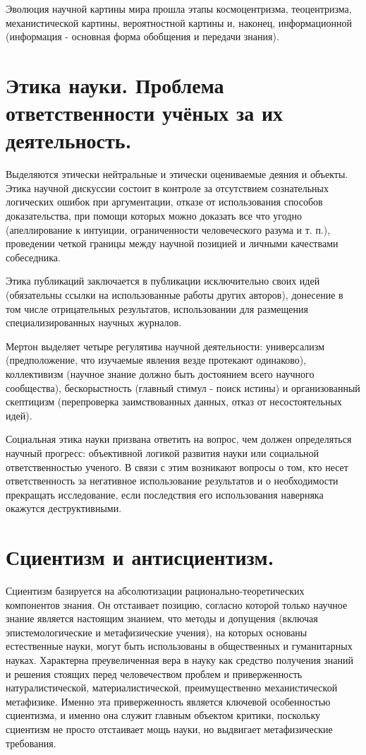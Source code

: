 \documentclass[12pt, specialist, subf, substylefile = spbu.rtx]{disser}
\begin{document}
Эволюция научной картины мира прошла этапы космоцентризма, теоцентризма, механистической картины, вероятностной картины и, наконец, информационной (информация - основная форма обобщения и передачи знания).

\section{Этика науки. Проблема ответственности учёных за их деятельность.}
Выделяются этически нейтральные и этически оцениваемые деяния и объекты.
Этика научной дискуссии состоит в контроле за отсутствием сознательных логических ошибок при аргументации, отказе от использования способов доказательства, при помощи которых можно доказать все что угодно (апеллирование к интуиции, ограниченности человеческого разума и т. п.), проведении четкой границы между научной позицией и личными качествами собеседника.

Этика публикаций заключается в публикации исключительно своих идей (обязательны ссылки на использованные работы других авторов), донесение в том числе отрицательных результатов, использовании для размещения специализированных научных журналов.

Мертон выделяет четыре регулятива научной деятельности: универсализм (предположение, что изучаемые явления везде протекают одинаково), коллективизм (научное знание должно быть достоянием всего научного сообщества), бескорыстность (главный стимул - поиск истины) и организованный скептицизм (перепроверка заимствованных данных, отказ от несостоятельных идей).

Социальная этика науки призвана ответить на вопрос, чем должен определяться научный прогресс: объективной логикой развития науки или социальной ответственностью ученого. В связи с этим возникают вопросы о том, кто несет ответственность за негативное использование результатов и о необходимости прекращать исследование, если последствия его использования наверняка окажутся деструктивными.

\section{Сциентизм и антисциентизм.}
Сциентизм базируется на абсолютизации рационально-теоретических компонентов знания. Он отстаивает позицию, согласно которой только научное знание является настоящим знанием, что методы и допущения (включая эпистемологические и метафизические учения), на которых основаны естественные науки, могут быть использованы в общественных и гуманитарных науках. Характерна преувеличенная вера в науку как средство получения знаний и решения стоящих перед человечеством проблем и приверженность натуралистической, материалистической, преимущественно механистической метафизике. Именно эта приверженность является ключевой особенностью сциентизма, и именно она служит главным объектом критики, поскольку сциентизм не просто отстаивает мощь науки, но выдвигает метафизические требования.
\end{document}
